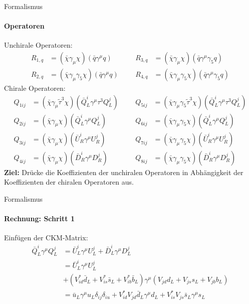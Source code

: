 \begin{frame}{Formalismus}
\framesubtitle{Operatoren}
Unchirale Operatoren:
\begin{align*}
	R_{1,q} &= (\bar{\chi}\gamma_\mu\chi)(\bar{q}\gamma^\mu q) && &R_{3,q} &= (\bar{\chi}\gamma_\mu\chi)(\bar{q}\gamma^\mu\gamma_5q) \\
	R_{2,q} &= (\bar{\chi}\gamma_\mu\gamma_5\chi)(\bar{q}\gamma^\mu q) &&	&R_{4,q} &= (\bar{\chi}\gamma_\mu\gamma_5\chi)(\bar{q}\gamma^\mu\gamma_5q)
\end{align*}
Chirale Operatoren:
\begin{align*}
	Q_{1ij} &= (\bar{\chi}\gamma_\mu\tilde{\tau}^3\chi)(\bar{Q}_L^i\gamma^\mu \tau^3Q_L^j) && &Q_{5ij} &= (\bar{\chi}\gamma_\mu\gamma_5\tilde{\tau}^3\chi)(\bar{Q}_L^i\gamma^\mu \tau^3Q_L^j) \\
	Q_{2ij} &= (\bar{\chi}\gamma_\mu\chi)(\bar{Q}_L^i\gamma^\mu Q_L^j) && &Q_{6ij} &= (\bar{\chi}\gamma_\mu\gamma_5\chi)(\bar{Q}_L^i\gamma^\mu Q_L^j) \\
	Q_{3ij} &= (\bar{\chi}\gamma_\mu\chi)(\bar{U}_R^i\gamma^\mu U_R^j) && &Q_{7ij} &= (\bar{\chi}\gamma_\mu\gamma_5\chi)(\bar{U}_R^i\gamma^\mu U_R^j) \\
	Q_{4ij} &= (\bar{\chi}\gamma_\mu\chi)(\bar{D}_R^i\gamma^\mu D_R^j) && &Q_{8ij} &= (\bar{\chi}\gamma_\mu\gamma_5\chi)(\bar{D}_R^i\gamma^\mu D_R^j)
\end{align*}
\textbf{Ziel:} Drücke die Koeffizienten der unchiralen Operatoren in Abhängigkeit der Koeffizienten der chiralen Operatoren aus.
\end{frame}


\begin{frame}{Formalismus}
\framesubtitle{Rechnung: Schritt 1}
Einfügen der CKM-Matrix:
\begin{align*}
	\bar{Q}_L^i\gamma^\mu Q_L^j &= \bar{U}_L^i\gamma^\mu U_L^j + \bar{D}_L^i\gamma^\mu D_L^j \\
	&= \bar{U}_L^i\gamma^\mu U_L^j \\
	&+ (V_{id}^*\bar{d}_L + V_{is}^*\bar{s}_L+V_{ib}^*\bar{b}_L)\gamma^\mu(V_{jd}d_L+V_{js}s_L+V_{jb}b_L) \\
	&= \bar{u}_L\gamma^\mu u_L\delta_{ij}\delta_{iu} + V_{id}^*V_{jd}\bar{d}_L\gamma^\mu d_L + V_{is}^*V_{js}\bar{s}_L\gamma^\mu s_L
\end{align*}
\end{frame}


